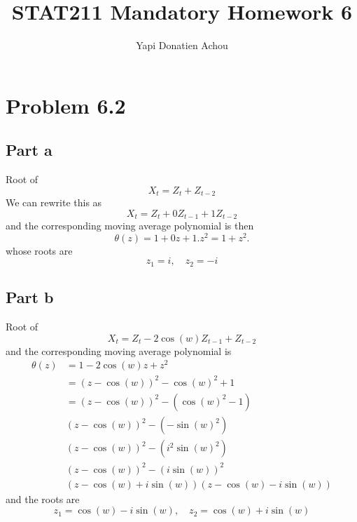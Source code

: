 \documentclass[11pt, oneside]{article}   	%
\title{STAT211 Mandatory Homework 6}
\author{Yapi Donatien Achou}
\begin{document}
\maketitle 
\tableofcontents
\newpage
 
 
 \section{Problem 6.2}
 \subsection{Part a}
 Root of 
 \begin{equation}
 X_{t} = Z_{t} + Z_{t-2}
 \end{equation}
 We can rewrite this as 
 \begin{equation}
 X_{t} = Z_{t} + 0Z_{t-1} + 1Z_{t-2}
 \end{equation}
 and the corresponding moving average polynomial is then 
 \begin{equation}
 \theta(z) = 1+ 0z + 1.z^{2} = 1 + z^{2}.
 \end{equation}
 whose roots are 
 \begin{equation}
 z_{1} = i, \quad z_{2} = -i
 \end{equation}
 \subsection{Part b}
 Root of 
 \begin{equation}
 X_{t} = Z_{t}  -2\cos(w)Z_{t-1} + Z_{t-2}
 \end{equation}
 and the corresponding moving average polynomial is 
 \begin{equation}
 \begin{split}
 \theta(z) &= 1-2\cos(w)z + z^{2}\\
 &=(z-\cos(w))^{2} - \cos(w)^{2} +1 \\
 &=(z-\cos(w))^{2} - (\cos(w)^{2} -1) \\
 &(z-\cos(w))^{2}  - (-\sin(w)^{2})\\
 &(z-\cos(w))^{2}  - (i^{2}\sin(w)^{2})\\
 &(z-\cos(w))^{2}  - (i\sin(w))^{2}\\
&(z-\cos(w) + i\sin(w))(z-\cos(w) - i\sin(w))
 \end{split}
 \end{equation}
 and the roots are 
 \begin{equation}
 z_{1} = \cos(w) -i\sin(w), \quad  z_{2} = \cos(w) +i\sin(w)
 \end{equation}
 
\end{document}
